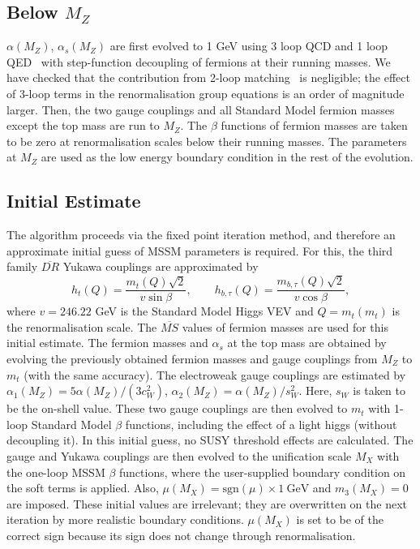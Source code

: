 \documentclass{article}
\def\gev{~\mbox{GeV}}
\begin{document}
\subsection{Below $M_Z$}

$\alpha(M_Z)$, $\alpha_s(M_Z)$ are first evolved to 1 GeV using 3 loop QCD and
1 loop QED~\cite{Gorishnii:1990zu,Tarasov:1980au,Gorishnii:1984zi} with
step-function decoupling of fermions at their running masses.
We have checked that the contribution from 2-loop
matching~\cite{Chetyrkin:1997sg} is negligible; the effect of 3-loop terms in
the renormalisation group equations
is an order of magnitude larger.
Then, the two gauge couplings and all Standard Model fermion masses except
the top mass are run to $M_Z$. The $\beta$ functions of fermion masses are
taken to be zero at renormalisation scales below their running masses.
The parameters at $M_Z$ are used as the low energy boundary condition in the
rest of the evolution.

\subsection{Initial Estimate}

The algorithm proceeds via the fixed point iteration method, and therefore an
approximate 
initial guess of MSSM parameters is required. 
For this, the third family $\overline{DR}$ Yukawa couplings are approximated
by 
\begin{equation}
h_t(Q) = \frac{m_t(Q) \sqrt{2}}{v \sin \beta}, \qquad
h_{b,\tau}(Q) = \frac{m_{b,\tau}(Q) \sqrt{2}}{v \cos \beta},
\end{equation}
where $v=246.22$ GeV is the Standard Model Higgs VEV and
$Q=m_t(m_t)$ is the renormalisation scale.
The $\overline{MS}$ values of fermion masses are used for this initial
estimate. 
The fermion masses and $\alpha_s$
at the top mass are obtained by evolving the previously
obtained fermion masses and gauge couplings from $M_Z$ to $m_t$ (with the same
accuracy). 
The electroweak gauge couplings are estimated by $\alpha_1(M_Z)
= 5 \alpha(M_Z) / (3 c_W^2)$, $\alpha_2(M_Z) = \alpha(M_Z) / s_W^2$. Here,
$s_W$ is taken to be the on-shell value. These two gauge couplings are then
evolved 
to $m_t$ with 1-loop Standard Model $\beta$ functions, including the effect of
a light higgs (without decoupling it). In this initial guess, no SUSY
threshold effects are calculated. The gauge and Yukawa couplings are then
evolved to the unification scale $M_X$ with the one-loop MSSM $\beta$
functions, where the user-supplied boundary 
condition on the soft terms is applied. 
Also, $\mu(M_X) =
\mbox{sgn}(\mu)\times1\gev$ and $m_3(M_X)=0$ are imposed. 
These initial values are irrelevant; they are overwritten on the next
iteration by more realistic boundary conditions.
$\mu(M_X)$ is set to be of the correct sign
because its sign does not change through renormalisation. 
\end{document}
